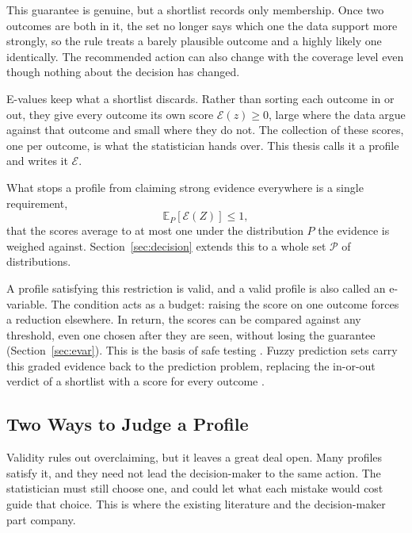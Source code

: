 This guarantee is genuine, but a shortlist records only membership. Once two
outcomes are both in it, the set no longer says which one the data support
more strongly, so the rule treats a barely plausible outcome and a highly
likely one identically. The recommended action can also change with the
coverage level even though nothing about the decision has changed.

E-values keep what a shortlist discards. Rather than sorting each outcome in
or out, they give every outcome its own score $\mathcal E(z)\geq0$, large
where the data argue against that outcome and small where they do not. The
collection of these scores, one per outcome, is what the statistician hands
over. This thesis calls it a profile and writes it $\mathcal E$.

What stops a profile from claiming strong evidence everywhere is a single
requirement,
\begin{equation}
  \mathbb E_{P}[\mathcal E(Z)]\leq 1 ,
  \label{eq:intro_validity}
\end{equation}
that the scores average to at most one under the distribution $P$ the evidence
is weighed against. Section~\ref{sec:decision} extends this to a whole set
$\mathcal P$ of distributions.

A profile satisfying this restriction is valid, and a valid profile is also
called an e-variable. The condition acts as a budget: raising the score on one outcome forces a reduction elsewhere. In return, the scores can be compared against any threshold, even one chosen after they are seen, without losing the guarantee (Section~\ref{sec:evar}). This is the basis of safe
testing \citep{Shafer2021,Grunwald2024safe,Ramdas2023}. Fuzzy prediction sets
carry this graded evidence back to the prediction problem, replacing the
in-or-out verdict of a shortlist with a score for every outcome
\citep{KoningvanMeer2025,Vovk2025,Gauthier2025}.

\subsection{Two Ways to Judge a Profile}\label{sec:intro_two}

Validity rules out overclaiming, but it leaves a great deal open. Many
profiles satisfy it, and they need not lead the decision-maker to the same
action. The statistician must still choose one, and could let what each
mistake would cost guide that choice. This is where the existing literature
and the decision-maker part company.

